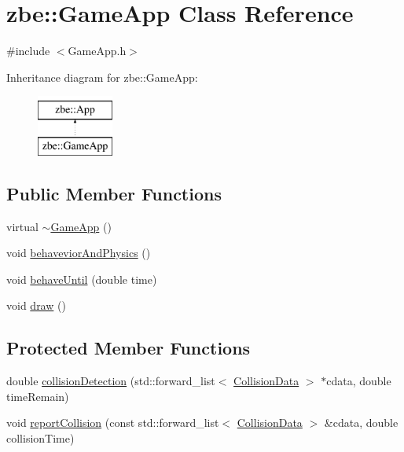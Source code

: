 \hypertarget{classzbe_1_1_game_app}{}\section{zbe\+:\+:Game\+App Class Reference}
\label{classzbe_1_1_game_app}


{\ttfamily \#include $<$Game\+App.\+h$>$}

Inheritance diagram for zbe\+:\+:Game\+App\+:\begin{figure}[H]
\begin{center}
\leavevmode
\includegraphics[height=2.000000cm]{classzbe_1_1_game_app}
\end{center}
\end{figure}
\subsection*{Public Member Functions}
\begin{DoxyCompactItemize}
\item 
virtual \hyperlink{classzbe_1_1_game_app_aa022d099e2c8e7937dd44fa15250b08e}{$\sim$\+Game\+App} ()
\item 
void \hyperlink{classzbe_1_1_game_app_ae392423ebb0a09e9505889efff180dca}{behavevior\+And\+Physics} ()
\item 
void \hyperlink{classzbe_1_1_game_app_a15f835d8a2ddacb5b521fa2235f77b94}{behave\+Until} (double time)
\item 
void \hyperlink{classzbe_1_1_game_app_aa78afb55a2eff504e40288bc0aef6d65}{draw} ()
\end{DoxyCompactItemize}
\subsection*{Protected Member Functions}
\begin{DoxyCompactItemize}
\item 
double \hyperlink{classzbe_1_1_game_app_a900a7f2dfa48b901bc9c8dc9dc196b79}{collision\+Detection} (std\+::forward\+\_\+list$<$ \hyperlink{classzbe_1_1_collision_data}{Collision\+Data} $>$ $\ast$cdata, double time\+Remain)
\item 
void \hyperlink{classzbe_1_1_game_app_a25d5110ddc958af4673790c1b2b7396e}{report\+Collision} (const std\+::forward\+\_\+list$<$ \hyperlink{classzbe_1_1_collision_data}{Collision\+Data} $>$ \&cdata, double collision\+Time)
\end{DoxyCompactItemize}


